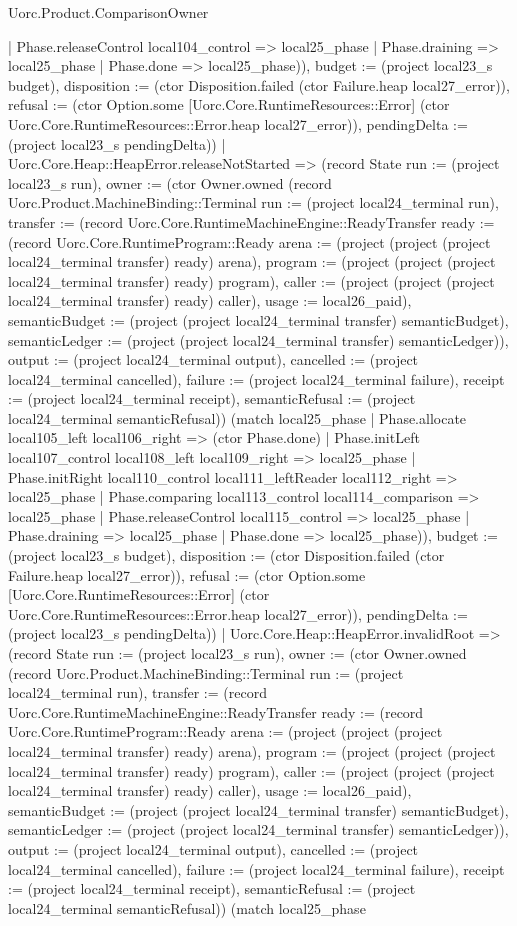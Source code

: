 \begin{lexlean}{Uorc.Product.ComparisonOwner}
\begin{semanticmodule}
{{      | Phase.releaseControl local104_control => local25_phase
      | Phase.draining => local25_phase
      | Phase.done => local25_phase)), budget := (project local23_s budget), disposition := (ctor Disposition.failed (ctor Failure.heap local27_error)), refusal := (ctor Option.some [Uorc.Core.RuntimeResources::Error] (ctor Uorc.Core.RuntimeResources::Error.heap local27_error)), pendingDelta := (project local23_s pendingDelta)})
    | Uorc.Core.Heap::HeapError.releaseNotStarted => (record State {run := (project local23_s run), owner := (ctor Owner.owned (record Uorc.Product.MachineBinding::Terminal {run := (project local24_terminal run), transfer := (record Uorc.Core.RuntimeMachineEngine::ReadyTransfer {ready := (record Uorc.Core.RuntimeProgram::Ready {arena := (project (project (project local24_terminal transfer) ready) arena), program := (project (project (project local24_terminal transfer) ready) program), caller := (project (project (project local24_terminal transfer) ready) caller), usage := local26_paid}), semanticBudget := (project (project local24_terminal transfer) semanticBudget), semanticLedger := (project (project local24_terminal transfer) semanticLedger)}), output := (project local24_terminal output), cancelled := (project local24_terminal cancelled), failure := (project local24_terminal failure), receipt := (project local24_terminal receipt), semanticRefusal := (project local24_terminal semanticRefusal)}) (match local25_phase
      | Phase.allocate local105_left local106_right => (ctor Phase.done)
      | Phase.initLeft local107_control local108_left local109_right => local25_phase
      | Phase.initRight local110_control local111_leftReader local112_right => local25_phase
      | Phase.comparing local113_control local114_comparison => local25_phase
      | Phase.releaseControl local115_control => local25_phase
      | Phase.draining => local25_phase
      | Phase.done => local25_phase)), budget := (project local23_s budget), disposition := (ctor Disposition.failed (ctor Failure.heap local27_error)), refusal := (ctor Option.some [Uorc.Core.RuntimeResources::Error] (ctor Uorc.Core.RuntimeResources::Error.heap local27_error)), pendingDelta := (project local23_s pendingDelta)})
    | Uorc.Core.Heap::HeapError.invalidRoot => (record State {run := (project local23_s run), owner := (ctor Owner.owned (record Uorc.Product.MachineBinding::Terminal {run := (project local24_terminal run), transfer := (record Uorc.Core.RuntimeMachineEngine::ReadyTransfer {ready := (record Uorc.Core.RuntimeProgram::Ready {arena := (project (project (project local24_terminal transfer) ready) arena), program := (project (project (project local24_terminal transfer) ready) program), caller := (project (project (project local24_terminal transfer) ready) caller), usage := local26_paid}), semanticBudget := (project (project local24_terminal transfer) semanticBudget), semanticLedger := (project (project local24_terminal transfer) semanticLedger)}), output := (project local24_terminal output), cancelled := (project local24_terminal cancelled), failure := (project local24_terminal failure), receipt := (project local24_terminal receipt), semanticRefusal := (project local24_terminal semanticRefusal)}) (match local25_phase
}}
\end{semanticmodule}
\end{lexlean}
